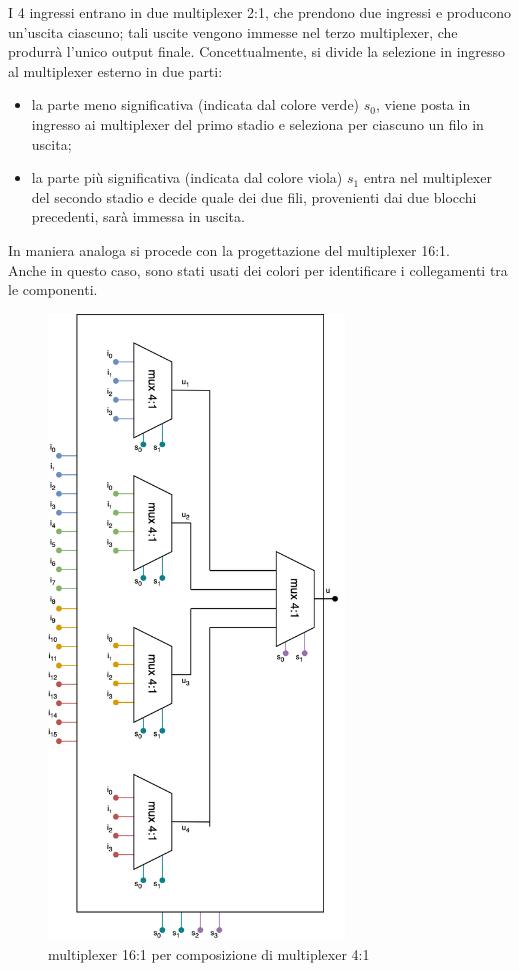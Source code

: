 I 4 ingressi entrano in due multiplexer 2:1, che prendono due ingressi e producono un'uscita ciascuno; tali uscite vengono immesse nel terzo multiplexer, che produrrà l'unico output finale. Concettualmente, si divide la selezione in ingresso al multiplexer esterno in due parti:
\begin{itemize}
    \item la parte meno significativa (indicata dal colore verde) \(s_0\), viene posta in ingresso ai multiplexer del primo stadio e seleziona per ciascuno un filo in uscita;
    \item la parte più significativa (indicata dal colore viola) \(s_1\) entra nel multiplexer del secondo stadio e decide quale dei due fili, provenienti dai due blocchi precedenti, sarà immessa in uscita.
\end{itemize}
In maniera analoga si procede con la progettazione del multiplexer 16:1.\\
Anche in questo caso, sono stati usati dei colori per identificare i collegamenti tra le componenti.
\begin{figure}[H]
	\centering
	\includegraphics[width=0.7\textwidth]{img/mux_16-1_composizione}
	\caption{multiplexer 16:1 per composizione di multiplexer 4:1}
	\label{mux_16:1_comp} 
\end{figure}


